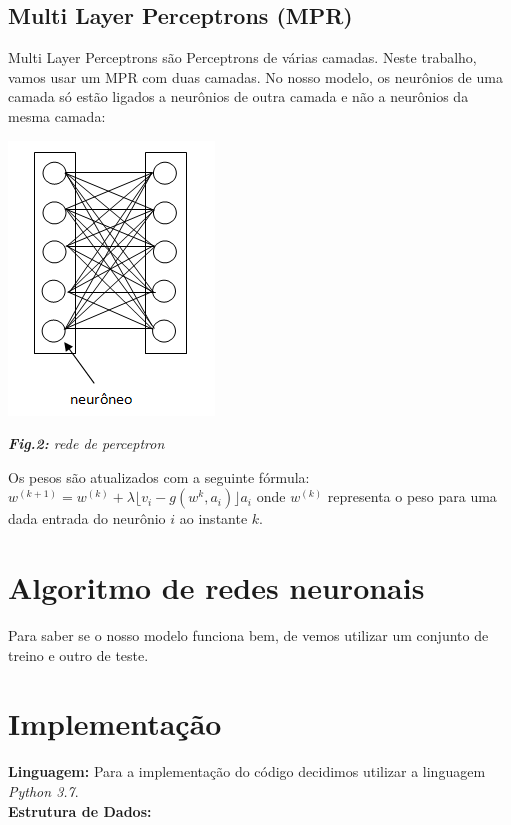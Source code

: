 \documentclass{article}
\begin{document}
\subsection{Multi Layer Perceptrons (MPR)}
\hspace{10 mm} Multi Layer Perceptrons são Perceptrons de várias camadas. Neste trabalho, vamos usar um MPR com duas camadas. No nosso modelo, os neurônios de uma camada só estão ligados a neurônios de outra camada e não a neurônios da mesma camada:

\begin{center} \includegraphics[scale=0.75]{perceptron.png} \end{center}
\begin{center} \textit{\textbf{Fig.2:} rede de perceptron }
\end{center}

Os pesos são atualizados com a seguinte fórmula:
$w^{(k+1)} = w^{(k)} + \lambda \lfloor v_{i} - g(w^{k},a_i) \rfloor a_i$
onde $w^{(k)}$ representa o peso para uma dada entrada do neurônio $i$ ao instante $k$.

\section{Algoritmo de redes neuronais}
\hspace{10 mm}Para saber se o nosso modelo funciona bem, de vemos utilizar um conjunto de treino e outro de teste.

\section{Implementação}
\textbf{Linguagem:} Para a implementação do código decidimos utilizar a linguagem \textit{Python 3.7}.\\[2mm]
\textbf{Estrutura de Dados:}
\end{document}
